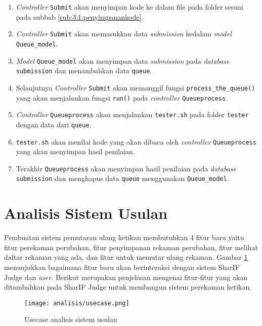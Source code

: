 \begin{enumerate}
	\item \textit{Controller} \verb|Submit| akan menyimpan kode ke dalam file pada folder sesuai pada subbab \ref{sub:3:1:penyimpanankode}.
	\item \textit{Controller} \verb|Submit| akan memasukkan data \textit{submission} kedalam \textit{model} \verb|Queue_model|.
	\item \textit{Model} \verb|Queue_model| akan menyimpan data \textit{submission} pada \textit{database} \verb|submission| dan menambahkan data \verb|queue|.
	\item Selanjutnya \textit{Controller} \verb|Submit| akan memanggil fungsi \verb|process_the_queue()| yang akan menjalankan fungsi \verb|run()| pada \textit{controller} \verb|Queueprocess|.
	\item \textit{Controller} \verb|Queueprocess| akan menjalankan \verb|tester.sh| pada folder \verb|tester| dengan data dari \verb|queue|.
	\item \verb|tester.sh| akan menilai kode yang akan dibaca oleh \textit{controller} \verb|Queueprocess| yang akan menyimpan hasil penilaian.
	\item Terakhir \verb|Queueprocess| akan menyimpan hasil penilaian pada \textit{database} \verb|submission| dan menghapus data \verb|queue| menggunakan \verb|Queue_model|.
\end{enumerate}


\section{Analisis Sistem Usulan}
\label{sec:3:sistemusulan}

Pembuatan sistem pemutaran ulang ketikan membutuhkan 4 fitur baru yaitu fitur perekaman perubahan, fitur penyimpanan rekaman perubahan, fitur melihat daftar rekaman yang ada, dan fitur untuk memutar ulang rekaman. Gambar \ref{fig:3:usecase} menunjukkan bagaimana fitur baru akan berinteraksi dengan sistem SharIF Judge dan \textit{user}. Berikut merupakan penjelasan mengenai fitur-fitur yang akan ditambahkan pada SharIF Judge untuk membangun sistem perekaman ketikan.

\begin{figure}[H]
	\centering
	\texttt{[image: analisis/usecase.png]}
	\caption{Usecase analisis sistem usulan}
	\label{fig:3:usecase}
\end{figure}

